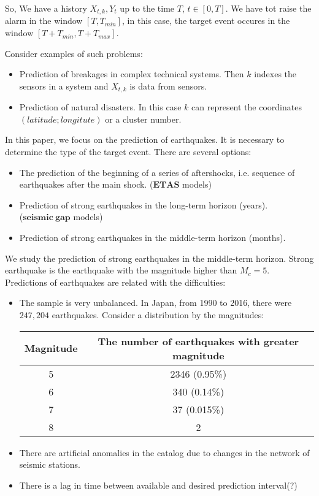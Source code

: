 \documentclass[12pt]{article}
\let\vec=\mathbf
\begin{document}
So, We have a history $X_{t,k},Y_t$ up to the time $T$, $t \in [0,T]$. We have tot raise the alarm in the window $[T,T_{min}]$, in this case, the target event occures in the window $[T+T_{min},T+T_{max}]$.

Сonsider examples of such problems:
\begin{itemize}
\item Prediction of breakages in complex technical systems. Then $k$ indexes the sensors in a system and $ X_ {t,k}$ is data from sensors.
\item Prediction of natural disasters. In this case $k$ can represent the coordinates $(latitude; longitute)$ or a cluster number. 
\end{itemize}

In this paper, we focus on the prediction of earthquakes. It is necessary to determine the type of the target event. There are several options:
\begin{itemize}
\item The prediction of the beginning of a series of aftershocks, i.e. sequence of earthquakes after the main shock. ($\vec{ETAS}$ models)
\item Prediction of strong earthquakes in the long-term horizon (years). \\($\vec{seismic~gap}$ models)
\item Prediction of strong earthquakes in the middle-term horizon (months).
\end{itemize}

We study the prediction of strong earthquakes in the middle-term horizon. Strong earthquake is the earthquake with the magnitude higher than $M_c = 5$.  Predictions of earthquakes are related with the difficulties:
\begin{itemize}
\item The sample is very unbalanced. In Japan, from 1990 to 2016, there were $247,204$ earthquakes. Consider a distribution by the magnitudes:
\begin{table}[H]
\centering
\begin{tabular}{cc}
\hline
\multicolumn{1}{c}{\textbf{Magnitude}} & \multicolumn{1}{c}{\textbf{The number of earthquakes with greater magnitude}} \\ \hline
5 & 2346 (0.95\%) \\
6 & 340 (0.14\%) \\
7 & 37 (0.015\%) \\
8 & 2
\end{tabular}
\end{table} 
\item There are artificial anomalies in the catalog due to changes in the network of seismic stations.
\item There is a lag in time between  available and desired prediction interval(?)
\end{itemize}
\end{document}

